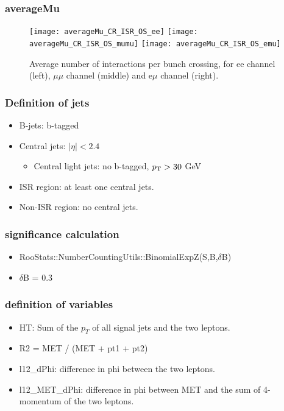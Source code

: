 \documentclass[mathserif,serif]{beamer}
\begin{document}
\begin{frame}
\frametitle{averageMu}
\begin{figure}
\texttt{[image: averageMu\_CR\_ISR\_OS\_ee]}
\texttt{[image: averageMu\_CR\_ISR\_OS\_mumu]}
\texttt{[image: averageMu\_CR\_ISR\_OS\_emu]} \\
\caption{Average number of interactions per bunch crossing, for ee channel (left), $\mu\mu$ channel (middle) and e$\mu$ channel (right).}
\end{figure}
\end{frame}

\begin{frame}
\frametitle{Definition of jets}
\normalsize
\begin{itemize}
\item B-jets: b-tagged
\item Central jets: $|\eta|<2.4$
\begin{itemize}
\item Central light jets: no b-tagged, $p_{\text{T}}>30$ GeV
\end{itemize}
\item ISR region: at least one central jets.
\item Non-ISR region: no central jets.
\end{itemize}
\end{frame}

\begin{frame}
\frametitle{significance calculation}
\begin{itemize}
\item RooStats::NumberCountingUtils::BinomialExpZ(S,B,$\delta$B)
\item $\delta$B = 0.3
\end{itemize}
\end{frame}

\begin{frame}
\frametitle{definition of variables}
\normalsize
\begin{itemize}
\item HT: Sum of the $p_T$ of all signal jets and the two leptons.
\item R2 = MET / (MET + pt1 + pt2)
\item l12\_dPhi: difference in phi between the two leptons.
\item l12\_MET\_dPhi: difference in phi between MET and the sum of 4-momentum of the two leptons.
\end{itemize}
\end{frame}
\end{document}

